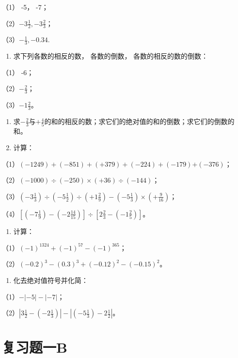 （1） -5， -7；

（2）\(-3\frac{1}{2}, -3\frac{2}{3}\)；

（3）\(-\frac{1}{3}, -0.34.\)

\begin{enumerate}[start=3]
\item
  求下列各数的相反的数， 各数的倒数， 各数的相反的数的倒数：
\end{enumerate}

（1） -6；

（2）\(-\frac{2}{3}\)；

（3）\(-1\frac{2}{3}\)。

\begin{enumerate}[start=4]
\item
  求\(-\frac{2}{3}\)与\(+\frac{4}{5}\)的和的相反的数；求它们的绝对值的和的倒数；求它们的倒数的和。
\item
  计算：
\end{enumerate}

（1）\((-1249) + (-851) + (+379) + (-224) + (-179)\)\(+(-376)\)；

（2）\((-1000) \div (-250) \times (+36) \div (-144)\)；

（3）\(\left(-3\frac{1}{3}\right) \div \left(-5\frac{1}{2}\right) \div \left(+1\frac{2}{9}\right) - \left(-5\frac{1}{3}\right) \times \left(+ \frac{9}{16}\right)\)；

（4）\(\left[\left(-7\frac{1}{9}\right)-\left(-2\frac{14}{15}\right)\right] \div \left[2\frac{2}{3}-\left(-1\frac{2}{5}\right)\right]\)。

\begin{enumerate}[start=6]
\item
  计算：
\end{enumerate}

（1）\((-1)^{1324} + (-1)^{57} - (-1)^{365}\)；

（2）\((-0.2)^{3} - (0.3)^{3} + (-0.12)^{2} - (-0.15)^{2}\)。

\begin{enumerate}[start=7]
\item
  化去绝对值符号并化简：
\end{enumerate}

（1）\(-| - 5| - | - 7|\)；

（2）\(\left|3\frac{1}{2} - \left(-2\frac{1}{3}\right)\right| - \left|\left(-5\frac{1}{3}\right) - 2\frac{1}{2}\right|\)。

\section{复习题一B}

